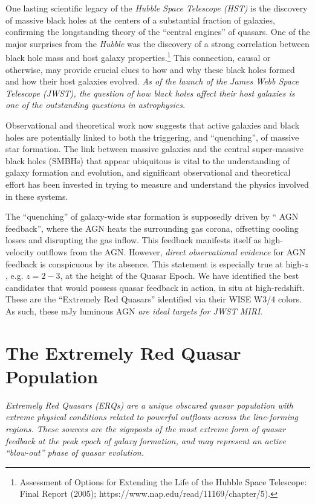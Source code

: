 One lasting scientific legacy of the {\it Hubble Space Telescope
(HST)} is the discovery of massive black holes at the centers of a
substantial fraction of galaxies, confirming the longstanding theory
of the ``central engines'' of quasars.  One of the major surprises
from the {\it Hubble} was the discovery of a strong correlation
between black hole mass and host galaxy
properties.\footnote{Assessment of Options for Extending the Life of
the Hubble Space Telescope: Final Report (2005);
https://www.nap.edu/read/11169/chapter/5).}  This connection, causal
or otherwise, may provide crucial clues to how and why these black
holes formed and how their host galaxies evolved. {\it As of the
launch of the James Webb Space Telescope (JWST), the question of how
black holes affect their host galaxies is one of the outstanding
questions in astrophysics.}

\smallskip \smallskip
\noindent
Observational and theoretical work now suggests that active galaxies
and black holes are potentially linked to both the triggering, and
``quenching'', of massive star formation. The link between massive
galaxies and the central super-massive black holes (SMBHs) that appear
ubiquitous is vital to the understanding of galaxy formation and
evolution, and significant observational and theoretical effort has
been invested in trying to measure and understand the physics involved
in these systems.  

\smallskip \smallskip
\noindent
The ``quenching'' of galaxy-wide star formation is supposedly driven
by `` AGN feedback'', where the AGN heats the surrounding gas corona,
offsetting cooling losses and disrupting the gas inflow. This feedback
manifests itself as high-velocity outflows from the AGN.  However,
{\it direct observational evidence} for AGN feedback is conspicuous by
its absence. This statement is especially true at high-$z$,
e.g. $z=2-3$, at the height of the Quasar Epoch.  We have identified
the best candidates that would possess quasar feedback in action, in
situ at high-redshift. These are the ``Extremely Red Quasars''
identified via their WISE W3/4 colors.  As such, these mJy luminous
AGN {\it are ideal targets for JWST MIRI}.


\section*{The Extremely Red Quasar Population} 
{\it Extremely Red Quasars (ERQs) are a unique obscured quasar
population with extreme physical conditions related to powerful
outflows across the line-forming regions. These sources are the
signposts of the most extreme form of quasar feedback at the peak
epoch of galaxy formation, and may represent an active ``blow-out''
phase of quasar evolution.}

